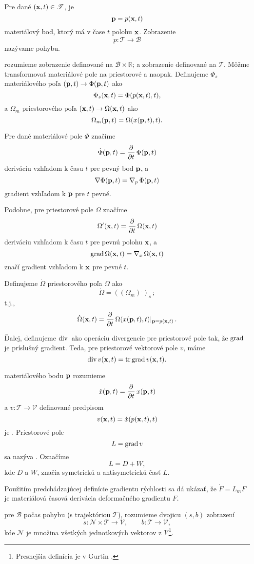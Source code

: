 Pre dané $(\textbf{x},t) \in \mathcal T$, je $$\textbf{p}=p(\textbf{x},t)$$ materiálový
bod, ktorý má v čase $t$ polohu $\textbf{x}$. Zobrazenie $$p:\mathcal
T\rightarrow\mathcal B$$ nazývame  pohybu.

 rozumieme zobrazenie definované na $\mathcal
B\times\mathbb R$; a  zobrazenie definované na $\mathcal
T$. Môžme transformovať materiálové pole na priestorové a naopak. Definujeme
 $\Phi_s$ materiálového poľa 
$(\textbf{p},t)\rightarrow\Phi(\textbf{p},t)$ ako $$\Phi_s(\textbf{x},t)=\Phi(p(\textbf{x},t),t),$$
a  $\Omega_m$ priestorového poľa
$(\textbf{x},t)\rightarrow\Omega(\textbf{x},t)$ ako $$\Omega_m(\textbf{p},t)=\Omega(x(\textbf{p},t),t).$$

Pre dané materiálové pole $\Phi$ značíme 
$$\dot\Phi(\textbf{p},t)=\frac{\partial}{\partial t}\, \Phi(\textbf{p},t)$$
deriváciu vzhľadom k času $t$ pre pevný bod $\textbf{p}$, a
$$\nabla\Phi(\textbf{p},t)=\nabla_p\,\Phi(\textbf{p},t)$$
gradient vzhľadom k $\textbf{p}$ pre $t$ pevné.

Podobne, pre priestorové pole $\Omega$ značíme 
$$\Omega'(\textbf{x},t)=\frac{\partial}{\partial t}\, \Omega(\textbf{x},t)$$
deriváciu vzhľadom k času $t$ pre pevnú polohu $\textbf{x}$, a
$$\mbox{grad}\,\Omega(\textbf{x},t)=\nabla_x\,\Omega(\textbf{x},t)$$
značí gradient vzhľadom k $\textbf{x}$ pre pevné $t$.

Definujeme  $\dot\Omega$ priestorového poľa
$\Omega$ ako $$\dot\Omega=((\Omega_m)^.)_s\,;$$ t.j.,
$$\dot\Omega(\textbf{x},t)=\frac{\partial}{\partial t}\, \Omega(x(\textbf{p},t),t)|_{\textbf{p}=p(\textbf{x},t)}\,.$$

Ďalej, definujeme  $\dv$ ako operáciu divergencie
pre priestorové pole tak, že $\grad$ je príslušný gradient. Teda,
pre priestorové vektorové pole $v$, máme 
$$\mbox{div}\,v(\textbf{x},t)=\mbox{tr}\,\mbox{grad}\,v(\textbf{x},t).$$

 materiálového bodu $\textbf{p}$ rozumieme $$\dot x(\textbf{p},t)=\frac{\partial}{\partial t}\,
x(\textbf{p},t)$$ a $v:\mathcal T\rightarrow\mathcal V$ definované predpisom
$$v(\textbf{x},t)=\dot x(p(\textbf{x},t),t)$$ 
je . 
Priestorové pole $$L=\mbox{grad}\,v$$ sa nazýva . Označíme
$$L=D+W,$$ kde $D$ a $W$, značia symetrickú a antisymetrickú časť $L$.

Použitím predchádzajúcej definície gradientu rýchlosti sa dá ukázať, že 
$\dot F=L_m F$ je materiálová časová derivácia deformačného gradientu $F$.

 pre $\mathcal B$ počas pohybu (s trajektóriou $\mathcal T$), 
rozumieme dvojicu $(s,b)$ zobrazení
$$s:\mathcal N\times\mathcal T\rightarrow\mathcal V, \qquad b:\mathcal T\rightarrow\mathcal V,$$
kde $\mathcal N$ je množina všetkých jednotkových vektorov 
z $\mathcal V$\footnote{Presnejšia definícia je v Gurtin \cite[s. 99]{gurtin}.}.

